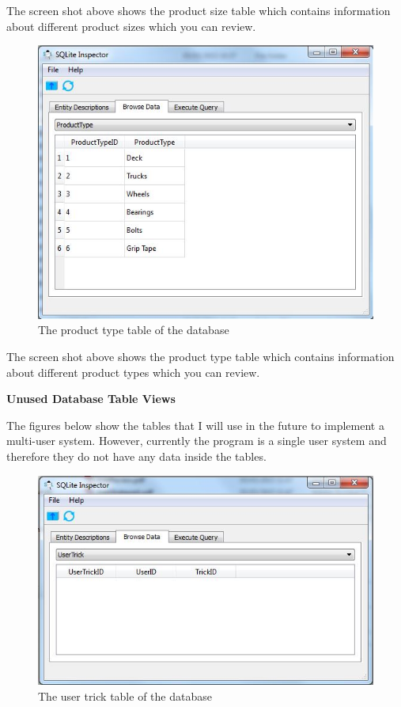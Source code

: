 The screen shot above shows the product size table which contains information about different product sizes which you can review.

\begin{figure}[H]
    \includegraphics[width=\textwidth]{./Maintenance/Figures/ProductTypeTable.jpg}
    \caption{The product type table of the database} \label{fig:ProductType Table}
\end{figure}

The screen shot above shows the product type table which contains information about different product types which you can review.

\textbf{Unused Database Table Views}

The figures below show the tables that I will use in the future to implement a multi-user system. However, currently the program is a single user system and therefore they do not have any data inside the tables.

\begin{figure}[H]
    \includegraphics[width=\textwidth]{./Maintenance/Figures/UserTrickTable.jpg}
    \caption{The user trick table of the database} \label{fig:UserTrick Table}
\end{figure}

